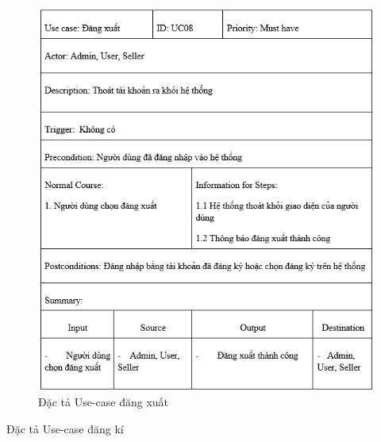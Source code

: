 \documentclass{article}
\begin{document}
{{{{{{{{	\begin{center}
		\begin{figure}[htp]
			\begin{center}
				\includegraphics[scale=.890]{anh18.png}
			\end{center}
			\caption{Đặc tả Use-case đăng xuất}
			
		\end{figure}
	\end{center}
\newpage
{\large Đặc tả Use-case đăng kí
	
}}}}}}}}}
\end{document}
